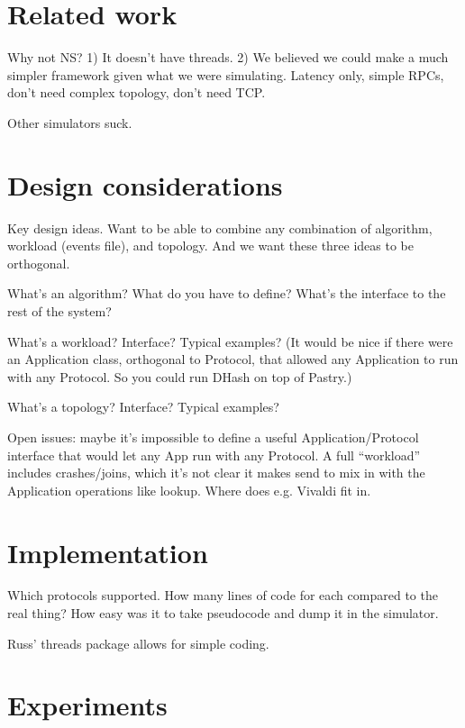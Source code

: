 \documentclass[letterpaper,twocolumn,10pt]{article}
\begin{document}
\section{Related work}
\label{Section:Related}

Why not NS? 1) It doesn't have threads. 2) We believed we could make a
much simpler framework given what we were simulating. Latency only,
simple RPCs, don't need complex topology, don't need TCP.

Other simulators suck.

\section{Design considerations}
\label{Section:Design}

Key design ideas. Want to be able to combine any combination of
algorithm, workload (events file), and topology. And we want these
three ideas to be orthogonal.

What's an algorithm? What do you have to define? What's the interface
to the rest of the system?

What's a workload? Interface? Typical examples? (It would be nice if
there were an Application class, orthogonal to Protocol, that allowed
any Application to run with any Protocol. So you could run DHash on
top of Pastry.)

What's a topology? Interface? Typical examples?

Open issues: maybe it's impossible to define a useful
Application/Protocol interface that would let any App run with any
Protocol. A full ``workload'' includes crashes/joins, which it's not
clear it makes send to mix in with the Application operations like
lookup. Where does e.g. Vivaldi fit in.

\section{Implementation}
\label{Section:Implementation}

Which protocols supported.  How many lines of code for each compared to the
real thing?  How easy was it to take pseudocode and dump it in the simulator.

Russ' threads package allows for simple coding.

\section{Experiments}
\label{Section:Experiments}
\end{document}
